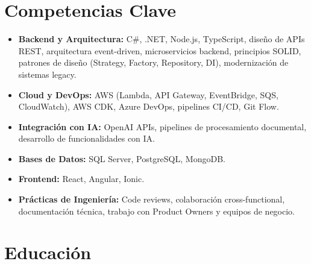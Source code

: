 \documentclass[11pt,a4paper,sans]{moderncv}
\begin{document}
\section{Competencias Clave}
\vspace{1pt}
\begin{itemize}
\item \textbf{Backend y Arquitectura:} C\#, .NET, Node.js, TypeScript, dise\~{n}o de APIs REST,
arquitectura event-driven, microservicios backend, principios SOLID, patrones de dise\~{n}o
(Strategy, Factory, Repository, DI), modernizaci\'{o}n de sistemas legacy.
\item \textbf{Cloud y DevOps:} AWS (Lambda, API Gateway, EventBridge, SQS, CloudWatch), AWS CDK,
Azure DevOps, pipelines CI/CD, Git Flow.
\item \textbf{Integraci\'{o}n con IA:} OpenAI APIs, pipelines de procesamiento documental,
desarrollo de funcionalidades con IA.
\item \textbf{Bases de Datos:} SQL Server, PostgreSQL, MongoDB.
\item \textbf{Frontend:} React, Angular, Ionic.
\item \textbf{Pr\'{a}cticas de Ingenier\'{i}a:} Code reviews, colaboraci\'{o}n cross-functional,
documentaci\'{o}n t\'{e}cnica, trabajo con Product Owners y equipos de negocio.
\end{itemize}

\section{Educaci\'{o}n}
\vspace{1pt}


\vspace{3pt}
\end{document}
